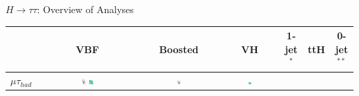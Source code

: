 \documentclass{beamer}
\begin{document}
\begin{frame}{$H \rightarrow \tau \tau$: Overview of Analyses}
	\begin{table}
		\begin{tabular}{c | c | c | c | c | c | c}
		
		
		 & VBF & Boosted & VH & 1-jet$^*$ & ttH & 0-jet$^{**}$\\ \hline \hline
		 
				
			$\mu \tau_{had}$ &
			\includegraphics[width=0.05\textwidth]{figures/atlas_logo.pdf} \includegraphics[width=0.05\textwidth]{figures/cms_logo.pdf} &
			\includegraphics[width=0.05\textwidth]{figures/atlas_logo.pdf} &
			\includegraphics[width=0.05\textwidth]{figures/cms_logo.pdf}&


\end{tabular}
\end{table}
\end{frame}
\end{document}
